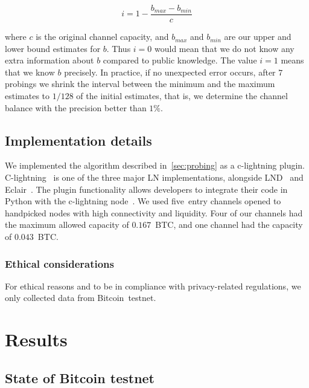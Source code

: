\[i = 1 - \frac{b_{max} - b_{min}}{c}\]

where $c$ is the original channel capacity, and $b_{max}$ and $b_{min}$ are our upper and lower bound estimates for $b$.
Thus $i=0$ would mean that we do not know any extra information about $b$ compared to public knowledge.
The value $i=1$ means that we know $b$ precisely.
In practice, if no unexpected error occurs, after $7$ probings we shrink the interval between the minimum and the maximum estimates to $1/128$ of the initial estimates, that is, we determine the channel balance with the precision better than $1\%$.


\subsection{Implementation details}

We implemented the algorithm described in~\cref{sec:probing} as a c-lightning plugin.
C-lightning~\cite{clightning} is one of the three major LN implementations, alongside LND~\cite{LND} and Eclair~\cite{Eclair}.
The plugin functionality allows developers to integrate their code in Python with the c-lightning node~\cite{clightningPlugins}.
We used five~entry channels opened to handpicked nodes with high connectivity and liquidity.
Four of our channels had the maximum allowed capacity of $0.167$~BTC, and one channel had the capacity of $0.043$~BTC.

\subsubsection*{Ethical considerations}
For ethical reasons and to be in compliance with privacy-related regulations, we only collected data from Bitcoin~testnet.



\section{Results} \label{sec:results}
\subsection{State of Bitcoin testnet}

